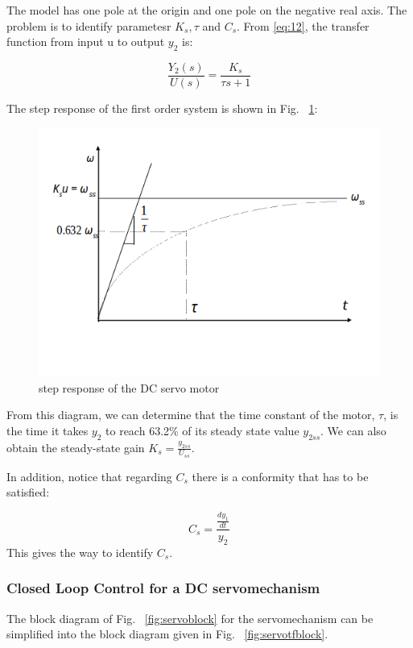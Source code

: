 \documentclass[11pt,a4paper]{article}
\begin{document}
The model has one pole at the origin and one pole on the negative real axis. The problem is to identify parametesr $K_{s}, \tau$ and $C_{s}$. From \ref{eq:12}, the transfer function from input u to output $y_{2}$ is:

\begin{equation} \label{eq:13}
\frac{Y_{2}(s)}{U(s)} = \frac{K_{s}}{\tau s + 1}
\end{equation}

The step response of the first order system is shown in Fig. ~\ref{fig:servostepresp}:

\begin{figure}[here]
\includegraphics[width=\textwidth]{imglab/servostepresponse.png}
\caption{step response of the DC servo motor}
\label{fig:servostepresp}
\end{figure}

From this diagram, we can determine that the time constant of the motor, $\tau$, is the time it takes $y_{2}$ to reach 63.2\% of its steady state value $y_{2ss}$. We can also obtain the steady-state gain $K_{s} = \frac{y_{2ss}}{U_{ss}}$.

In addition, notice that regarding $C_{s}$ there is a conformity that has to be satisfied:

\begin{equation} \label{eq:14}
C_{s} = \frac{\frac{dy_{1}}{dt}}{y_2}
\end{equation}
This gives the way to identify $C_{s}$.

\subsubsection{Closed Loop Control for a DC servomechanism}
The block diagram of Fig. ~\ref{fig:servoblock} for the servomechanism can be simplified into the block diagram given in Fig. ~\ref{fig:servotfblock}.
\end{document}
